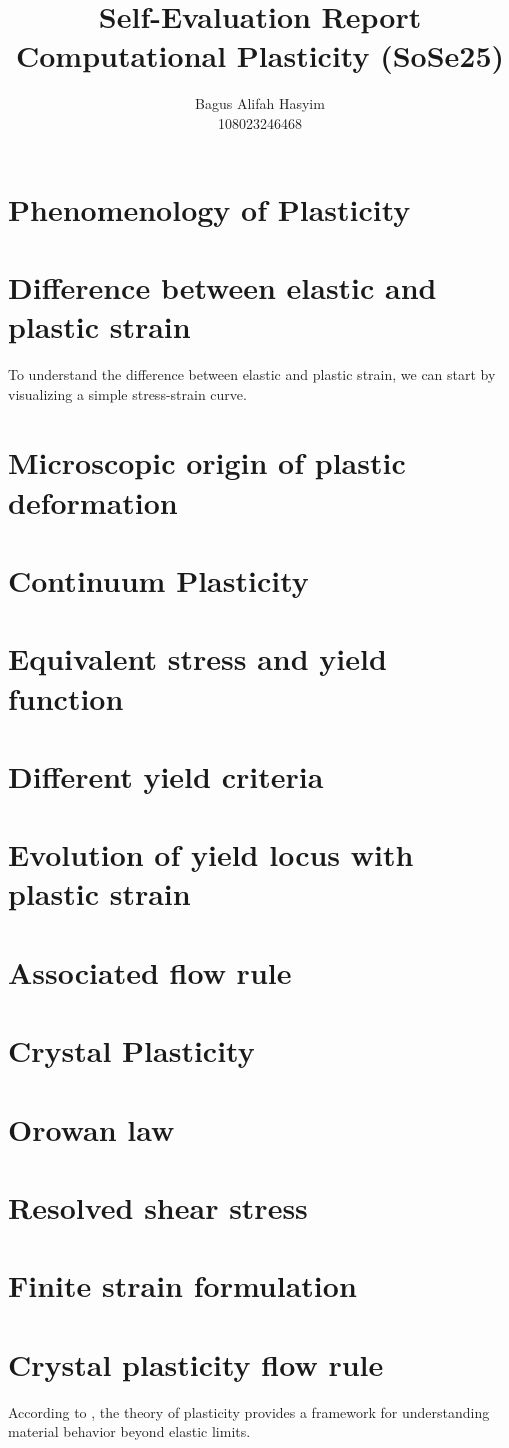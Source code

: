 \documentclass[12pt]{article}
\title{Self-Evaluation Report \\ \large Computational Plasticity (SoSe25)}
\author{Bagus Alifah Hasyim \\ 108023246468}
\date{}
\begin{document}
\maketitle

\section*{Phenomenology of Plasticity}

\section{Difference between elastic and plastic strain}
\hspace{2em}To understand the difference between elastic and plastic strain, we can start by visualizing a simple stress-strain
curve. 
\section{Microscopic origin of plastic deformation}

\section*{Continuum Plasticity}
\section{Equivalent stress and yield function}
\section{Different yield criteria}
\section{Evolution of yield locus with plastic strain}
\section{Associated flow rule}

\section*{Crystal Plasticity}
\section{Orowan law}
\section{Resolved shear stress}
\section{Finite strain formulation}
\section{Crystal plasticity flow rule}

According to \cite{Hill1950}, the theory of plasticity provides a framework for understanding material behavior beyond elastic limits.



\end{document}
